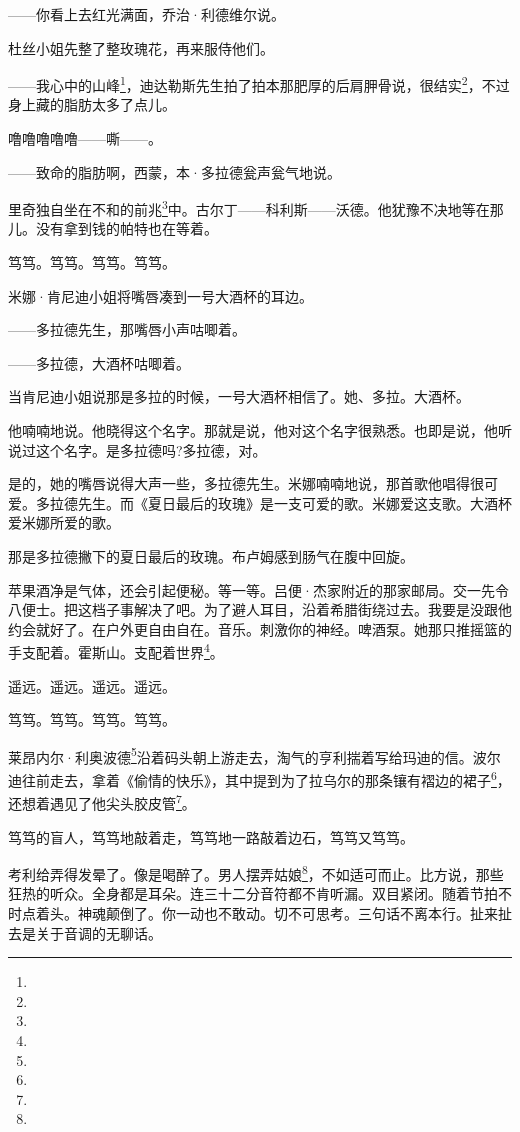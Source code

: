 \par ——你看上去红光满面，乔治·利德维尔说。
\par 杜丝小姐先整了整玫瑰花，再来服侍他们。
\par ——我心中的山峰\footnote{}，迪达勒斯先生拍了拍本那肥厚的后肩胛骨说，很结实\footnote{}，不过身上藏的脂肪太多了点儿。
\par 噜噜噜噜噜——嘶——。
\par ——致命的脂肪啊，西蒙，本·多拉德瓮声瓮气地说。
\par 里奇独自坐在不和的前兆\footnote{}中。古尔丁——科利斯——沃德。他犹豫不决地等在那儿。没有拿到钱的帕特也在等着。
\par 笃笃。笃笃。笃笃。笃笃。
\par 米娜·肯尼迪小姐将嘴唇凑到一号大酒杯的耳边。
\par ——多拉德先生，那嘴唇小声咕唧着。
\par ——多拉德，大酒杯咕唧着。
\par 当肯尼迪小姐说那是多拉的时候，一号大酒杯相信了。她、多拉。大酒杯。
\par 他喃喃地说。他晓得这个名字。那就是说，他对这个名字很熟悉。也即是说，他听说过这个名字。是多拉德吗?多拉德，对。
\par 是的，她的嘴唇说得大声一些，多拉德先生。米娜喃喃地说，那首歌他唱得很可爱。多拉德先生。而《夏日最后的玫瑰》是一支可爱的歌。米娜爱这支歌。大酒杯爱米娜所爱的歌。
\par 那是多拉德撇下的夏日最后的玫瑰。布卢姆感到肠气在腹中回旋。
\par 苹果酒净是气体，还会引起便秘。等一等。吕便·杰家附近的那家邮局。交一先令八便士。把这档子事解决了吧。为了避人耳目，沿着希腊街绕过去。我要是没跟他约会就好了。在户外更自由自在。音乐。刺激你的神经。啤酒泵。她那只推摇篮的手支配着。霍斯山。支配着世界\footnote{}。
\par 遥远。遥远。遥远。遥远。
\par 笃笃。笃笃。笃笃。笃笃。
\par 莱昂内尔·利奥波德\footnote{}沿着码头朝上游走去，淘气的亨利揣着写给玛迪的信。波尔迪往前走去，拿着《偷情的快乐》，其中提到为了拉乌尔的那条镶有褶边的裙子\footnote{}，还想着遇见了他尖头胶皮管\footnote{}。
\par 笃笃的盲人，笃笃地敲着走，笃笃地一路敲着边石，笃笃又笃笃。
\par 考利给弄得发晕了。像是喝醉了。男人摆弄姑娘\footnote{}，不如适可而止。比方说，那些狂热的听众。全身都是耳朵。连三十二分音符都不肯听漏。双目紧闭。随着节拍不时点着头。神魂颠倒了。你一动也不敢动。切不可思考。三句话不离本行。扯来扯去是关于音调的无聊话。
